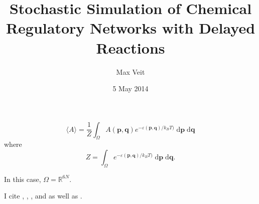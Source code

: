 \documentclass[english,letterpaper,12pt]{article}
\newcommand{\dee}{\;\mathrm{d}}
\renewcommand{\vec}[1]{\ensuremath{\mathbf{#1}}}
\begin{document}
\title{Stochastic Simulation of Chemical Regulatory Networks with Delayed Reactions}
\author{Max Veit}
\date{5 May 2014}

\maketitle

\begin{doublespacing}

\lipsum[1-2]

\begin{equation}
    \langle A \rangle = \frac{1}{Z} \int_\Omega A(\vec{p}, \vec{q}) e^{-\varepsilon(\vec{p}, \vec{q}) / k_B T)} \dee \vec{p} \dee \vec{q}
\end{equation}
where
\begin{equation}
    Z = \int_\Omega e^{-\varepsilon(\vec{p}, \vec{q}) / k_B T)}\dee \vec{p} \dee \vec{q}.
\end{equation}

In this case, $\Omega = \mathbb{R}^{6N}$.

I cite \cite{bistable-modeling}, \cite{we-exact}, \cite{we-chemkin}, and \cite{delay-oscillations} as well as \cite{gillespie-ssa}.

\lipsum[3-4]

\end{doublespacing}



\end{document}
